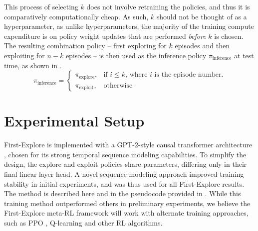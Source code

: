 \documentclass{article}
\begin{document}
This process of selecting \(k\) does not involve retraining the policies, and thus it is comparatively computationally cheap. As such, \(k\) should not be thought of as a hyperparameter, as unlike hyperparameters, the majority of the training compute expenditure is on policy weight updates that are performed \textit{before} \(k\) is chosen.
The resulting combination policy -- first exploring for \(k\) episodes and then exploiting for \(n-k\) episodes -- is then used as the inference policy \(\pi_{\text{inference}}\) at test time, as shown in .
\begin{equation}
\label{inference_eqn}
\pi_{\text{inference}} =
\begin{cases}
    \pi_{\text{explore}},& \text{if } i \leq k \text{, where \(i\) is the episode number.}\\
    \pi_{\text{exploit}},              & \text{otherwise}
\end{cases}
\end{equation}
\section{Experimental Setup}
First-Explore is implemented with a GPT-2-style causal transformer architecture \citep{radford2019language}, chosen for its strong temporal sequence modeling capabilities. To simplify the design, the explore and exploit policies share parameters, differing only in their final linear-layer head.
A novel sequence-modeling approach improved training stability in initial experiments, and was thus used for all First-Explore results. The method is described here and in the pseudocode provided in . While this training method outperformed others in preliminary experiments, we believe the First-Explore meta-RL framework will work with alternate training approaches, such as PPO \citep{schulman2017proximal}, Q-learning \citep{mnih2013playing} and other RL algorithms.
\end{document}
